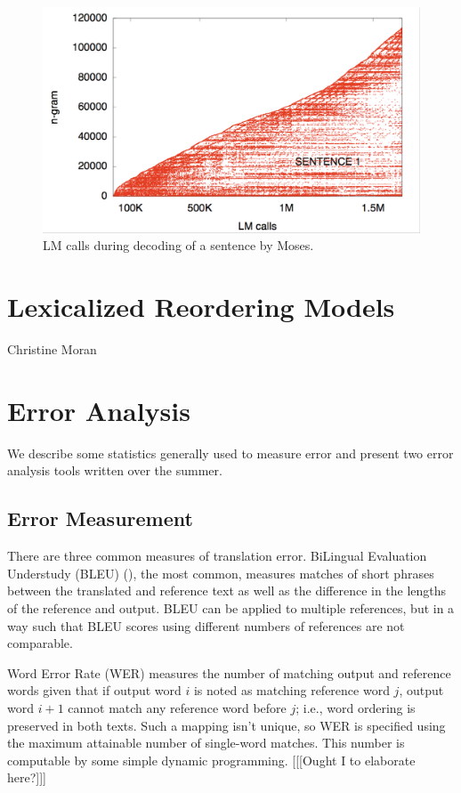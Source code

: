 \documentclass[10pt]{report}
\theoremstyle{plain}
\begin{document}
{\begin{figure}
\begin{center}
\label{fig:LM-calls}
\caption{LM calls during decoding of a sentence by Moses.}
 \includegraphics[width=\columnwidth]{marcello-lmcalls}
\end{center}
 \end{figure}
\section{Lexicalized Reordering Models}
{\sc Christine Moran}

\section{Error Analysis}
We describe some statistics generally used to measure error and present two error analysis tools written over the summer.

\subsection{Error Measurement}
There are three common measures of translation error. BiLingual Evaluation Understudy (BLEU) (\cite{bleu}), the most common, measures matches of short phrases between the translated and reference text as well as the difference in the lengths of the reference and output. BLEU can be applied to multiple references, but in a way such that BLEU scores using different numbers of references are not comparable.

Word Error Rate (WER) measures the number of matching output and reference words given that if output word $i$ is noted as matching reference word $j$, output word $i + 1$ cannot match any reference word before $j$; i.e., word ordering is preserved in both texts. Such a mapping isn't unique, so WER is specified using the maximum attainable number of single-word matches. This number is computable by some simple dynamic programming. [[[Ought I to elaborate here?]]]

}
\end{document}
